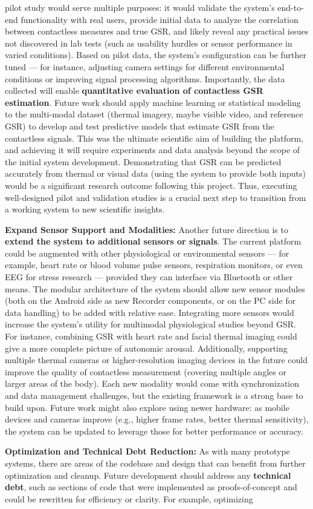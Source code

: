 pilot study would serve multiple purposes: it would validate the system's end-to-end functionality with real users, provide initial data to analyze the correlation between contactless measures and true GSR, and likely reveal any practical issues not discovered in lab tests (such as usability hurdles or sensor performance in varied conditions). Based on pilot data, the system's configuration can be further tuned --- for instance, adjusting camera settings for different environmental conditions or improving signal processing algorithms. Importantly, the data collected will enable \textbf{quantitative evaluation of contactless GSR estimation}. Future work should apply machine learning or statistical modeling to the multi-modal dataset (thermal imagery, maybe visible video, and reference GSR) to develop and test predictive models that estimate GSR from the contactless signals. This was the ultimate scientific aim of building the platform, and achieving it will require experiments and data analysis beyond the scope of the initial system development. Demonstrating that GSR can be predicted accurately from thermal or visual data (using the system to provide both inputs) would be a significant research outcome following this project. Thus, executing well-designed pilot and validation studies is a crucial next step to transition from a working system to new scientific insights. \item \textbf{Expand Sensor Support and Modalities:} Another future direction is to \textbf{extend the system to additional sensors or signals}. The current platform could be augmented with other physiological or environmental sensors --- for example, heart rate or blood volume pulse sensors, respiration monitors, or even EEG for stress research --- provided they can interface via Bluetooth or other means. The modular architecture of the system should allow new sensor modules (both on the Android side as new Recorder components, or on the PC side for data handling) to be added with relative ease. Integrating more sensors would increase the system's utility for multimodal physiological studies beyond GSR. For instance, combining GSR with heart rate and facial thermal imaging could give a more complete picture of autonomic arousal. Additionally, supporting multiple thermal cameras or higher-resolution imaging devices in the future could improve the quality of contactless measurement (covering multiple angles or larger areas of the body). Each new modality would come with synchronization and data management challenges, but the existing framework is a strong base to build upon. Future work might also explore using newer hardware: as mobile devices and cameras improve (e.g., higher frame rates, better thermal sensitivity), the system can be updated to leverage those for better performance or accuracy. \item \textbf{Optimization and Technical Debt Reduction:} As with many prototype systems, there are areas of the codebase and design that can benefit from further optimization and cleanup. Future development should address any \textbf{technical debt}, such as sections of code that were implemented as proofs-of-concept and could be rewritten for efficiency or clarity. For example, optimizing 